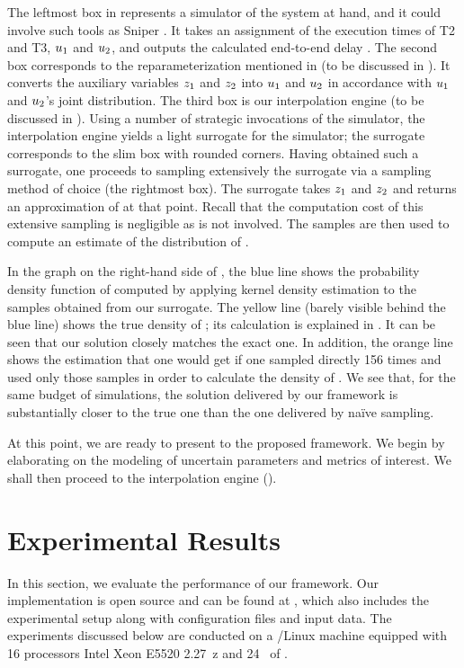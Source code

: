 The leftmost box in  represents a simulator of the system at hand,
and it could involve such tools as Sniper \cite{carlson2011}. It takes an
assignment of the execution times of T2 and T3, $u_1$ and $u_2$, and outputs
the calculated end-to-end delay \g. The second box corresponds to the
reparameterization mentioned in  (to be discussed in
). It converts the auxiliary variables $z_1$ and $z_2$ into
$u_1$ and $u_2$ in accordance with $u_1$ and $u_2$'s joint distribution. The
third box is our interpolation engine (to be discussed in ).
Using a number of strategic invocations of the simulator, the interpolation
engine yields a light surrogate for the simulator; the surrogate corresponds to
the slim box with rounded corners. Having obtained such a surrogate, one
proceeds to sampling extensively the surrogate via a sampling method of choice
(the rightmost box). The surrogate takes $z_1$ and $z_2$ and returns an
approximation of \g at that point. Recall that the computation cost of this
extensive sampling is negligible as \g is not involved. The samples are then
used to compute an estimate of the distribution of \g.

In the graph on the right-hand side of , the blue line shows the
probability density function of \g computed by applying kernel density
estimation to the samples obtained from our surrogate. The yellow line (barely
visible behind the blue line) shows the true density of \g; its calculation is
explained in . It can be seen that our solution closely
matches the exact one. In addition, the orange line shows the estimation that
one would get if one sampled \g directly 156 times and used only those samples
in order to calculate the density of \g. We see that, for the same budget of
simulations, the solution delivered by our framework is substantially closer to
the true one than the one delivered by na\"{i}ve sampling.

At this point, we are ready to present to the proposed framework. We begin by
elaborating on the modeling of uncertain parameters and metrics of interest. We
shall then proceed to the interpolation engine ().

\section{Experimental Results}

In this section, we evaluate the performance of our framework. Our
implementation is open source and can be found at \cite{sources}, which also
includes the experimental setup along with configuration files and input data.
The experiments discussed below are conducted on a /Linux machine
equipped with 16 processors Intel Xeon E5520 2.27~z and 24~ of
.

